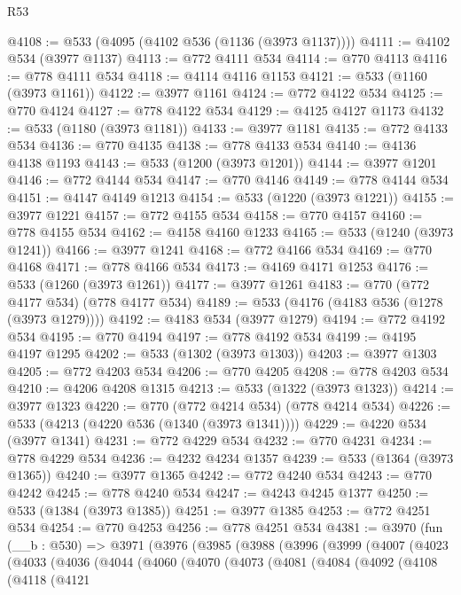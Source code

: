 \begin{lexlean}{R53}
\begin{coremodule}
@4108 := @533 (@4095 (@4102 @536 (@1136 (@3973 @1137))))
@4111 := @4102 @534 (@3977 @1137)
@4113 := @772 @4111 @534
@4114 := @770 @4113
@4116 := @778 @4111 @534
@4118 := @4114 @4116 @1153
@4121 := @533 (@1160 (@3973 @1161))
@4122 := @3977 @1161
@4124 := @772 @4122 @534
@4125 := @770 @4124
@4127 := @778 @4122 @534
@4129 := @4125 @4127 @1173
@4132 := @533 (@1180 (@3973 @1181))
@4133 := @3977 @1181
@4135 := @772 @4133 @534
@4136 := @770 @4135
@4138 := @778 @4133 @534
@4140 := @4136 @4138 @1193
@4143 := @533 (@1200 (@3973 @1201))
@4144 := @3977 @1201
@4146 := @772 @4144 @534
@4147 := @770 @4146
@4149 := @778 @4144 @534
@4151 := @4147 @4149 @1213
@4154 := @533 (@1220 (@3973 @1221))
@4155 := @3977 @1221
@4157 := @772 @4155 @534
@4158 := @770 @4157
@4160 := @778 @4155 @534
@4162 := @4158 @4160 @1233
@4165 := @533 (@1240 (@3973 @1241))
@4166 := @3977 @1241
@4168 := @772 @4166 @534
@4169 := @770 @4168
@4171 := @778 @4166 @534
@4173 := @4169 @4171 @1253
@4176 := @533 (@1260 (@3973 @1261))
@4177 := @3977 @1261
@4183 := @770 (@772 @4177 @534) (@778 @4177 @534)
@4189 := @533 (@4176 (@4183 @536 (@1278 (@3973 @1279))))
@4192 := @4183 @534 (@3977 @1279)
@4194 := @772 @4192 @534
@4195 := @770 @4194
@4197 := @778 @4192 @534
@4199 := @4195 @4197 @1295
@4202 := @533 (@1302 (@3973 @1303))
@4203 := @3977 @1303
@4205 := @772 @4203 @534
@4206 := @770 @4205
@4208 := @778 @4203 @534
@4210 := @4206 @4208 @1315
@4213 := @533 (@1322 (@3973 @1323))
@4214 := @3977 @1323
@4220 := @770 (@772 @4214 @534) (@778 @4214 @534)
@4226 := @533 (@4213 (@4220 @536 (@1340 (@3973 @1341))))
@4229 := @4220 @534 (@3977 @1341)
@4231 := @772 @4229 @534
@4232 := @770 @4231
@4234 := @778 @4229 @534
@4236 := @4232 @4234 @1357
@4239 := @533 (@1364 (@3973 @1365))
@4240 := @3977 @1365
@4242 := @772 @4240 @534
@4243 := @770 @4242
@4245 := @778 @4240 @534
@4247 := @4243 @4245 @1377
@4250 := @533 (@1384 (@3973 @1385))
@4251 := @3977 @1385
@4253 := @772 @4251 @534
@4254 := @770 @4253
@4256 := @778 @4251 @534
@4381 := @3970
    (fun (__b : @530) =>
    @3971
      (@3976
        (@3985
          (@3988
            (@3996
              (@3999
                (@4007
                  (@4023
                    (@4033
                      (@4036
                        (@4044
                          (@4060
                            (@4070
                              (@4073
                                (@4081
                                  (@4084
                                    (@4092
                                      (@4108
                                        (@4118
                                          (@4121

\end{coremodule}
\end{lexlean}
